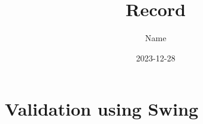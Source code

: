 \documentclass{article}
\title{Record}
\author{Name}
\date{2023-12-28}
\begin{document}
%
\tableofcontents
\newpage

\section{Validation using Swing}

\newpage

%
%
%
\end{document}

